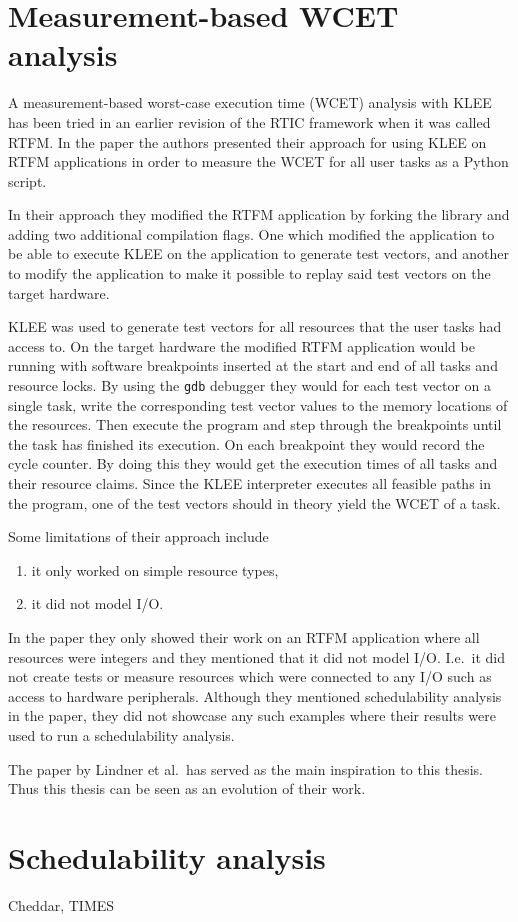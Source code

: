 \section{Measurement-based WCET analysis}
A measurement-based worst-case execution time (WCET) analysis with KLEE has
been tried in an earlier revision of the RTIC framework\cite{lindner} when it
was called RTFM. In the paper the authors presented their approach for using
KLEE on RTFM applications in order to measure the WCET for all user tasks as a
Python script.

In their approach they modified the RTFM application by forking the library and
adding two additional compilation flags. One which modified the application to be
able to execute KLEE on the application to generate test vectors, and another
to modify the application to make it possible to replay said test vectors on
the target hardware.

KLEE was used to generate test vectors for all resources that the user tasks
had access to. On the target hardware the modified RTFM application would be
running with software breakpoints inserted at the start and end of all tasks
and resource locks. By using the \texttt{gdb} debugger they would for each test
vector on a single task, write the corresponding test vector values to the
memory locations of the resources. Then execute the program and step through the
breakpoints until the task has finished its execution. On each breakpoint
they would record the cycle counter. By doing this they would get the execution
times of all tasks and their resource claims. Since the KLEE interpreter
executes all feasible paths in the program, one of the test vectors should
in theory yield the WCET of a task.


Some limitations of their approach include
\begin{enumerate}
    \item it only worked on simple resource types,
    \item it did not model I/O.
\end{enumerate}
In the paper they only showed their work on an RTFM application where all
resources were integers and they mentioned that it did not model I/O. I.e.\
it did not create tests or measure resources which were connected to any I/O
such as access to hardware peripherals. Although they mentioned schedulability
analysis in the paper, they did not showcase any such examples where their
results were used to run a schedulability analysis.

The paper by Lindner et al.\ has served as the main inspiration to this thesis.
Thus this thesis can be seen as an evolution of their work.

\section{Schedulability analysis}
Cheddar, TIMES 
